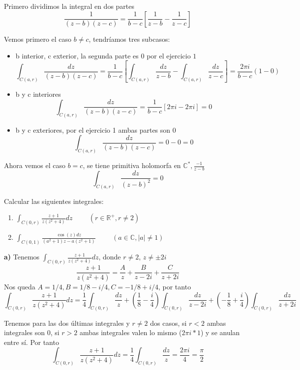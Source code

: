 \begin{sol}
	Primero dividimos la integral en dos partes
	$$\frac{1}{(z-b)(z-c)} = \frac{1}{b-c} \left[\frac{1}{z-b}-\frac{1}{z-c}\right]$$
	
	Vemos primero el caso $b\not = c$, tendríamos tres subcasos:
	\begin{itemize}
		\item b interior, c exterior, la segunda parte es $0$ por el ejercicio $1$
		$$\int_{C(a,r)} \frac{dz}{(z-b)(z-c)} = \frac{1}{b-c} \left[ \int_{C(a,r)} \frac{dz}{z-b} - \int_{C(a,r)} \frac{dz}{z-c} \right] = \frac{2\pi i}{b-c} (1 - 0)$$
		
		\item b y c interiores 
		$$\int_{C(a,r)} \frac{dz}{(z-b)(z-c)} =  \frac{1}{b-c}[2\pi i - 2\pi i] = 0$$
		
		\item b y c exteriores, por el ejercicio 1 ambas partes son $0$
		$$\int_{C(a,r)} \frac{dz}{(z-b)(z-c)} = 0-0 = 0$$
	\end{itemize}
	
	Ahora vemos el caso $b=c$, se tiene primitiva holomorfa en $\mathbb{C}^{\ast}, \frac{-1}{z-b}$
	$$ \int_{C(a,r)} \frac{dz}{(z-b)^2} = 0 $$
	
\end{sol}


\begin{ejer}
	Calcular las siguientes integrales:
	\begin{enumerate}[label=(\alph*)]
		\item $\int_{C(0,r)} \frac{z+1}{z(z^2+4)}dz \hspace{1cm} (r\in\mathbb{R}^+, r\not =2)$
		\item $\int_{C(0,1)} \frac{\cos(z)dz}{(a^2+1)z-a(z^2+1)} \hspace{1cm} (a\in\mathbb{C}, |a|\not =1)$
	\end{enumerate}
\end{ejer}

\begin{sol}
	
	\textbf{a)}
	Tenemos $\int_{C(0,r)} \frac{z+1}{z(z^2+4)} dz$, donde $r\not = 2$, $z\not = \pm 2i$
	$$\frac{z+1}{z(z^2+4)} = \frac{A}{z} + \frac{B}{z-2i} + \frac{C}{z+2i}$$
	Nos queda $A = 1/4, B=1/8-i/4, C = -1/8+i/4$, por tanto
	$$\int_{C(0,r)} \frac{z+1}{z(z^2+4)} dz = \frac{1}{4} \int_{C(0,r)} \frac{dz}{z} 
	+ \left(\frac{1}{8}-\frac{i}{4}\right)\int_{C(0,r)} \frac{dz}{z-2i} 
	+
	\left(-\frac{1}{8}+\frac{i}{4}\right) \int_{C(0,r)} \frac{dz}{z+2i}$$
	
	Tenemos para las dos últimas integrales y $r\not = 2$ dos casos, si $r<2$ ambas integrales son $0$, si $r>2$ ambas integrales valen lo mismo ($2\pi i *1$) y se anulan entre sí. Por tanto
	$$\int_{C(0,r)} \frac{z+1}{z(z^2+4)} dz
	=
	\frac{1}{4}\int_{C(0,r)} \frac{dz}{z} = \frac{2\pi i}{4} = \frac{\pi}{2}$$
	
\end{sol}


